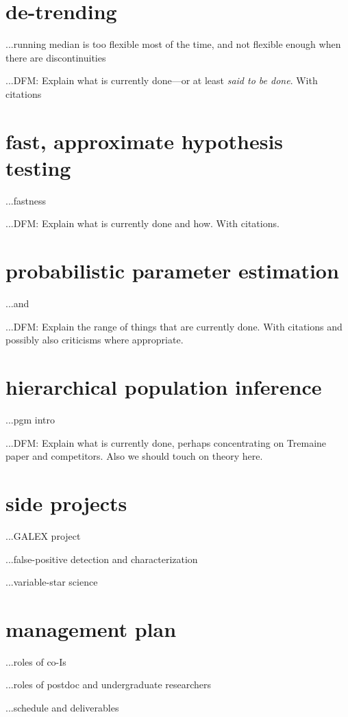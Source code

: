 \documentclass[letterpaper,12pt]{article}
\newcommand{\Bart}{\package{Bart}}
\newcommand{\emcee}{\package{emcee}}
\begin{document}
\section{de-trending}

...running median is too flexible most of the time, and not flexible enough when there are discontinuities

...DFM: Explain what is currently done---or at least \emph{said to be done}.  With citations

\section{fast, approximate hypothesis testing}

...fastness

...DFM:  Explain what is currently done and how.  With citations.

\section{probabilistic parameter estimation}

...\Bart and \emcee

...DFM:  Explain the range of things that are currently done.  With citations and possibly also criticisms where appropriate.

\section{hierarchical population inference}

...pgm intro

...DFM:  Explain what is currently done, perhaps concentrating on Tremaine paper and competitors.  Also we should touch on theory here.

\section{side projects}

...GALEX project

...false-positive detection and characterization

...variable-star science

\section{management plan}

...roles of co-Is

...roles of postdoc and undergraduate researchers

...schedule and deliverables
\end{document}
